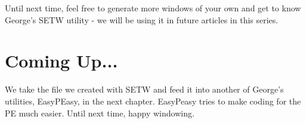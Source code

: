 Until next time, feel free to generate more windows of your own and get
            to know George's SETW utility -{} we will be using it in future articles in this
            series.

\section{Coming Up...}
\label{ch24-the-end}%

We take the file we created with SETW and feed it into
        another of George's utilities, EasyPEasy, in the next chapter. EasyPeasy tries to make coding for the PE
        much easier. Until next time, happy windowing.


